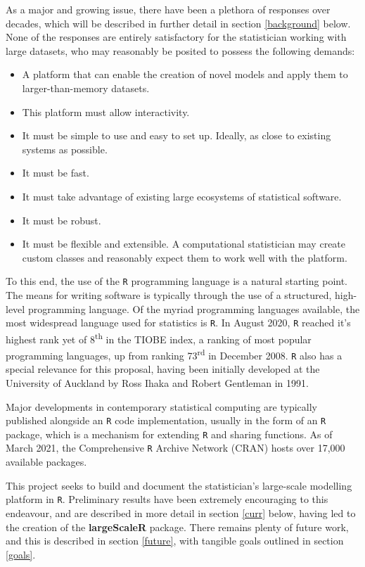 As a major and growing issue, there have been a plethora of responses over decades, which will be described in further detail in section \ref{background} below.
None of the responses are entirely satisfactory for the statistician working with large datasets, who may reasonably be posited to possess the following demands:

\begin{itemize}
        \item A platform that can enable the creation of novel models and apply them to larger-than-memory datasets.
        \item This platform must allow interactivity.
        \item It must be simple to use and easy to set up.
                Ideally, as close to existing systems as possible.
        \item It must be fast.
        \item It must take advantage of existing large ecosystems of statistical software.
        \item It must be robust.
        \item It must be flexible and extensible.
                A computational statistician may create custom classes and reasonably expect them to work well with the platform.
\end{itemize}

To this end, the use of the \texttt{R} programming language is a natural starting point.
The means for writing software is typically through the use of a structured, high-level programming language.
Of the myriad programming languages available, the most widespread language used for statistics is \texttt{R}.
In August 2020, \texttt{R} reached it's highest rank yet of 8\textsuperscript{th} in the TIOBE index, a ranking of most popular programming languages, up from ranking 73\textsuperscript{rd} in December 2008\cite{tiobe2021r}.
\texttt{R} also has a special relevance for this proposal, having been initially developed at the University of Auckland by Ross Ihaka and Robert Gentleman in 1991\cite{ihaka1996r}.

Major developments in contemporary statistical computing are typically published alongside an \texttt{R} code implementation, usually in the form of an \texttt{R} package, which is a mechanism for extending \texttt{R} and sharing functions.
As of March 2021, the Comprehensive \texttt{R} Archive Network (CRAN) hosts over 17,000 available packages\cite{team20:_r}.

This project seeks to build and document the statistician's large-scale modelling platform in \texttt{R}.
Preliminary results have been extremely encouraging to this endeavour, and are described in more detail in section \ref{curr} below, having led to the creation of the \textbf{largeScaleR} package\cite{cairns2020largescaler}.
There remains plenty of future work, and this is described in section \ref{future}, with tangible goals outlined in section \ref{goals}.

